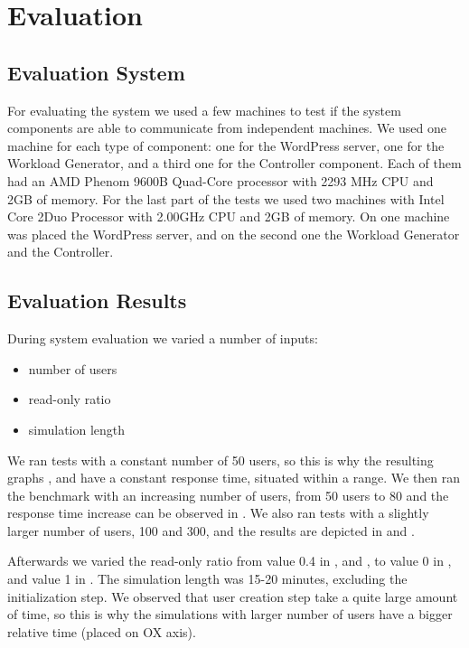 \chapter{Evaluation}
\label{chapter:chapter5}

\section{Evaluation System}
\label{sec:testing-system}

For evaluating the system we used a few machines to test if the system components are able to communicate from independent machines. We used one machine for each type of component: one for the WordPress server, one for the Workload Generator, and a third one for the Controller component. Each of them had an AMD Phenom 9600B Quad-Core processor with 2293 MHz CPU and 2GB of memory. For the last part of the tests we used two machines with Intel Core 2Duo Processor with 2.00GHz CPU and 2GB of memory. On one machine was placed the WordPress server, and on the second one the Workload Generator and the Controller.

\section{Evaluation Results}
\label{sub-sec:test-results}

During system evaluation we varied a number of inputs:
\begin{itemize}
 \item number of users
 \item read-only ratio
 \item simulation length
\end{itemize}

We ran tests with a constant number of 50 users, so this is why the resulting graphs ,  and  have a constant response time, situated within a range. We then ran the benchmark with an increasing number of users, from 50 users to 80 and the response time increase can be observed in . We also ran tests with a slightly larger number of users, 100 and 300, and the results are depicted in  and .

Afterwards we varied the read-only ratio from value 0.4 in ,  and , to value 0  in , and value 1 in . The simulation length was 15-20 minutes, excluding the initialization step. We observed that user creation step take a quite large amount of time, so this is why the simulations with larger number of users have a bigger relative time (placed on OX axis).

